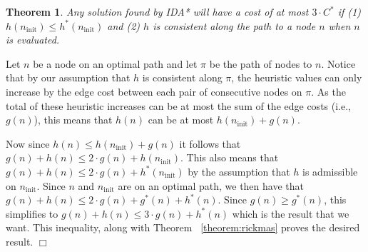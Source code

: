 \documentclass{article}
\newtheorem{theorem}{Theorem}
\newenvironment{proof}{\par\noindent{\em Proof.}}{\hfill $\Box$\medskip}
\begin{document}
\begin{theorem}
Any solution found by IDA* will have a cost of at most $3 \cdot C^*$ if (1) $h(n_{\mathrm{init}}) \leq h^*(n_{\mathrm{init}})$ and (2) $h$ is consistent along the path to a node $n$ when $n$ is evaluated.
\label{the:h_increase_policy}
\end{theorem}
\begin{proof}
%
Let $n$ be a node on an optimal path %
and let $\pi$ be the path of nodes to $n$.
Notice that by our assumption that $h$ is consistent along $\pi$, the heuristic values can only increase by the edge cost between each pair of consecutive nodes on $\pi$.
As the total of these heuristic increases can be at most the sum of the edge costs (i.e., $g(n)$), this means that $h(n)$ can be at most $h(n_{\mathrm{init}}) + g(n)$.

Now since $h(n) \leq h(n_{\mathrm{init}}) + g(n)$ it follows that $g(n) + h(n) \leq 2 \cdot g(n) + h(n_{\mathrm{init}})$. This also means that $g(n) + h(n) \leq 2 \cdot g(n) + h^*(n_{\mathrm{init}})$ by the assumption that $h$ is admissible on $n_{\mathrm{init}}$.
Since $n$ and $n_{\mathrm{init}}$ are on an optimal path, we then have that $g(n) + h(n) \leq 2 \cdot g(n) + g^*(n) + h^*(n)$.
Since $g(n) \geq g^*(n)$, this simplifies to $g(n) + h(n) \leq 3 \cdot g(n) + h^*(n)$ which is the result that we want. This inequality, along with Theorem 
~\ref{theorem:rickmas} 
proves the desired result.
\end{proof}
\end{document}
